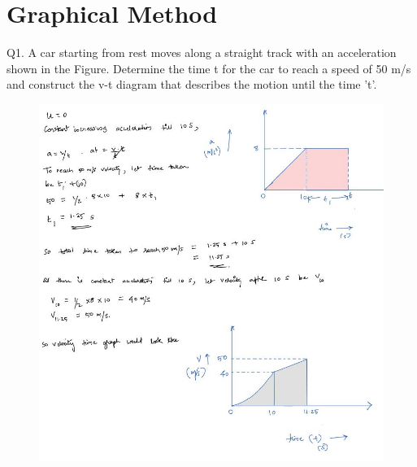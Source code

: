 \documentclass[11pt]{article}
\begin{document}
\section{Graphical Method}
Q1. A car starting from rest moves along a straight track with an acceleration shown in the Figure. Determine the time t for the car to reach a speed of 50 m/s and construct the v-t diagram that describes the motion until the time 't'.
\begin{figure}[H]
	\includegraphics[scale=0.65]{g1.jpg}
	\label{fig: Polygon Law}
\end{figure}
\end{document}

